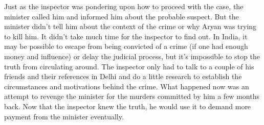 Just as the inspector was pondering upon how to proceed with the case, the
minister called him and informed him about the probable suspect. But the
minister didn't tell him about the context of the crime or why Aryan was trying
to kill him. It didn't take much time for the inspector to find out. In India,
it may be possible to escape from being convicted of a crime (if one had enough
money and influence) or delay the judicial process, but it's impossible to stop
the truth from circulating around. The inspector only had to talk to a couple of
his friends and their references in Delhi and do a little research to establish
the circumstances and motivations behind the crime. What happened now was an
attempt to revenge the minister for the murders committed by him a few months
back. Now that the inspector knew the truth, he would use it to demand more
payment from the minister eventually.